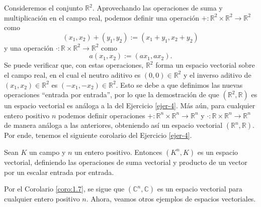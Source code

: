\documentclass[apuntes]{subfiles}
\begin{document}

Consideremos el conjunto $\mathbb{R}^2$. Aprovechando las operaciones de suma y multiplicación en el campo real, podemos definir una operación $+:\mathbb{R}^2\times\mathbb{R}^2\to \mathbb{R}^2$ como
\[
    (x_1, x_2) + (y_1,y_2) := (x_1+y_1,x_2+y_2)
\] 
y una operación $\cdot:\mathbb{R}\times \mathbb{R}^2\to \mathbb{R}^2$ como
\[
    a(x_1,x_2) := (ax_1,ax_2).
\] 
Se puede verificar que, con estas operaciones, $\mathbb{R}^2$ forma un espacio vectorial sobre el campo real, en el cual el neutro aditivo es $(0,0)\in\mathbb{R}^2$ y el inverso aditivo de $(x_1,x_2)\in\mathbb{R}^2$ es $(-x_1,-x_2)\in\mathbb{R}^2$. Esto se debe a que definimos las nuevas operaciones ``entrada por entrada'', por lo que la demostración de que $(\mathbb{R}^2,\mathbb{R})$ es un espacio vectorial es análoga a la del Ejercicio \ref{ejer-4}. Más aún, para cualquier entero positivo $n$ podemos definir operaciones $+:\mathbb{R}^n\times \mathbb{R}^n\to \mathbb{R}^n$ y $\cdot:\mathbb{R}\times \mathbb{R}^n\to \mathbb{R}^n$ de manera análoga a las anteriores, obteniendo así un espacio vectorial $(\mathbb{R}^n,\mathbb{R})$. Por ende, tenemos el siguiente corolario del Ejercicio \ref{ejer-4}.

\begin{Coro}\label{coro:1.7}
    
    Sean $K$ un campo y $n$ un entero positivo. Entonces $(K^n,K)$ es un espacio vectorial, definiendo las operaciones de suma vectorial y producto de un vector por un escalar entrada por entrada.
\end{Coro}

\noindent Por el Corolario \ref{coro:1.7}, se sigue que $(\mathbb{C}^n,\mathbb{C})$ es un espacio vectorial para cualquier entero positivo $n$. Ahora, veamos otros ejemplos de espacios vectoriales. \\
\end{document}
